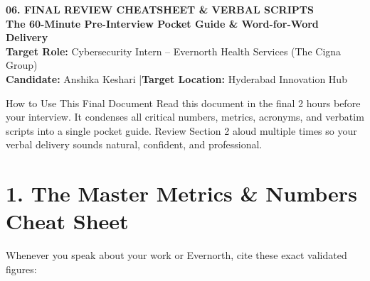 \documentclass[10pt,a4paper]{article}
\begin{document}
\begin{center}
    {\Huge \textbf{\color{primary}06. FINAL REVIEW CHEATSHEET \& VERBAL SCRIPTS}}\\[5pt]
    {\Large \textbf{\color{secondary}The 60-Minute Pre-Interview Pocket Guide \& Word-for-Word Delivery}}\\[4pt]
    \textbf{Target Role:} Cybersecurity Intern -- Evernorth Health Services (The Cigna Group)\\[2pt]
    \textbf{Candidate:} Anshika Keshari \quad|\quad \textbf{Target Location:} Hyderabad Innovation Hub
\end{center}

\vspace{0.2cm}

\begin{calloutbox}{How to Use This Final Document}
Read this document in the final 2 hours before your interview. It condenses all critical numbers, metrics, acronyms, and verbatim scripts into a single pocket guide. Review Section 2 aloud multiple times so your verbal delivery sounds natural, confident, and professional.
\end{calloutbox}

\section{1. The Master Metrics \& Numbers Cheat Sheet}

Whenever you speak about your work or Evernorth, cite these exact validated figures:
\end{document}
